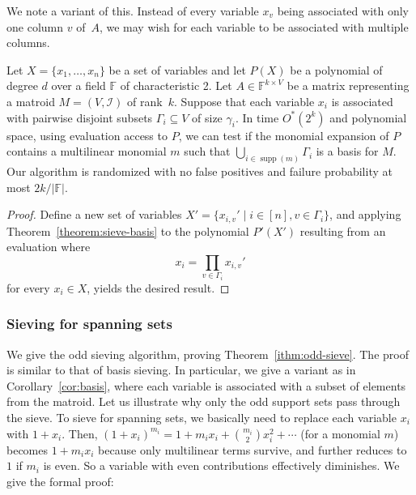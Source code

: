 \documentclass{theoretics}
\newcommand{\F}{\ensuremath{\mathbb F}\xspace}
\newcommand{\cI}{\ensuremath{\mathcal I}\xspace}
\DeclareMathOperator{\supp}{supp}
\begin{document}
We note a variant of this. Instead of every variable $x_v$ being associated with
only one column $v$ of~$A$, we may wish for each variable to be associated with
multiple columns. 

\begin{corollary} \label{cor:basis}
  Let $X=\{x_1,\ldots,x_n\}$ be a set of variables and 
  let $P(X)$ be a polynomial of degree $d$ over a field $\F$ of characteristic 2.
  Let $A \in \F^{k \times V}$ be a matrix representing a matroid $M=(V, \cI)$ of rank~$k$. 
  Suppose that each variable $x_i$ is associated with pairwise disjoint subsets $\Gamma_i \subseteq V$ of size $\gamma_i$.
  In time $O^*(2^k)$ and polynomial space, using evaluation access to $P$, 
  we can test if the monomial expansion of $P$ contains a multilinear monomial
  $m$ such that $\bigcup_{i \in \supp(m)} \Gamma_i$ is a basis for $M$. Our algorithm is randomized with no false
  positives and failure probability at most $2k/|\F|$.
\end{corollary}
\begin{proof}
  Define a new set of variables $X' = \{ x_{i,v}' \mid i \in [n], v \in \Gamma_i \}$, and
  applying Theorem~\ref{theorem:sieve-basis} to the polynomial $P'(X')$
  resulting from an evaluation where
  \[
    x_i = \prod_{v \in \Gamma_i} x_{i,v}'
  \]
  for every $x_i \in X$, yields the desired result.
\end{proof}

\subsubsection{Sieving for spanning sets} \label{sec:odd-sieve}

We give the odd sieving algorithm, proving Theorem~\ref{ithm:odd-sieve}.
The proof is similar to that of basis sieving.
In particular, we give a variant as in Corollary~\ref{cor:basis}, where each variable is associated with a subset of elements from the matroid.
Let us illustrate why only the odd support sets pass through the sieve.
To sieve for spanning sets, we basically need to replace each variable $x_i$ with $1 + x_i$.
Then, $(1 + x_i)^{m_i} = 1 + m_i x_i + \binom{m_i}{2} x_i^2 + \cdots$ (for a monomial $m$) becomes $1 + m_i x_i$ because only multilinear terms survive, and further reduces to $1$ if $m_i$ is even.  
So a variable with even contributions effectively diminishes.
We give the formal proof:
\end{document}
